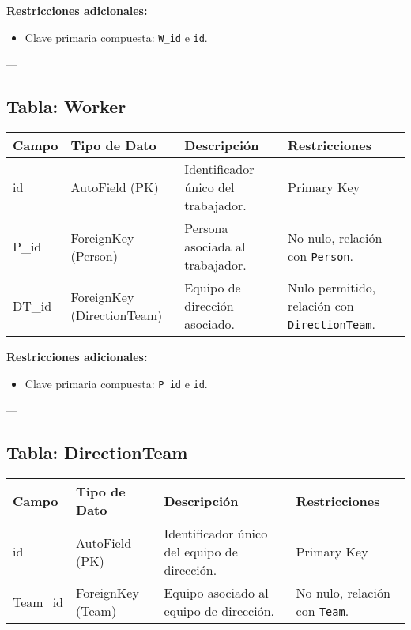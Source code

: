 \documentclass{report}
\begin{document}
    \textbf{Restricciones adicionales:}
    \begin{itemize}
        \item Clave primaria compuesta: \texttt{W\_id} e \texttt{id}.
    \end{itemize}
    
    ---
    
    \subsection*{Tabla: Worker}
    \begin{tabular}{|>{\raggedright\arraybackslash}p{3cm}|>{\raggedright\arraybackslash}p{3cm}|>{\raggedright\arraybackslash}p{6cm}|>{\raggedright\arraybackslash}p{4cm}|}
        \hline
        \textbf{Campo} & \textbf{Tipo de Dato} & \textbf{Descripción} & \textbf{Restricciones} \\
        \hline
        id & AutoField (PK) & Identificador único del trabajador. & Primary Key \\
        \hline
        P\_id & ForeignKey (Person) & Persona asociada al trabajador. & No nulo, relación con \texttt{Person}. \\
        \hline
        DT\_id & ForeignKey (DirectionTeam) & Equipo de dirección asociado. & Nulo permitido, relación con \texttt{DirectionTeam}. \\
        \hline
    \end{tabular}
    
    \textbf{Restricciones adicionales:}
    \begin{itemize}
        \item Clave primaria compuesta: \texttt{P\_id} e \texttt{id}.
    \end{itemize}
    
    ---
    
    \subsection*{Tabla: DirectionTeam}
    \begin{tabular}{|>{\raggedright\arraybackslash}p{3cm}|>{\raggedright\arraybackslash}p{3cm}|>{\raggedright\arraybackslash}p{6cm}|>{\raggedright\arraybackslash}p{4cm}|}
        \hline
        \textbf{Campo} & \textbf{Tipo de Dato} & \textbf{Descripción} & \textbf{Restricciones} \\
        \hline
        id & AutoField (PK) & Identificador único del equipo de dirección. & Primary Key \\
        \hline
        Team\_id & ForeignKey (Team) & Equipo asociado al equipo de dirección. & No nulo, relación con \texttt{Team}. \\
        \hline
    \end{tabular}
    
\end{document}
